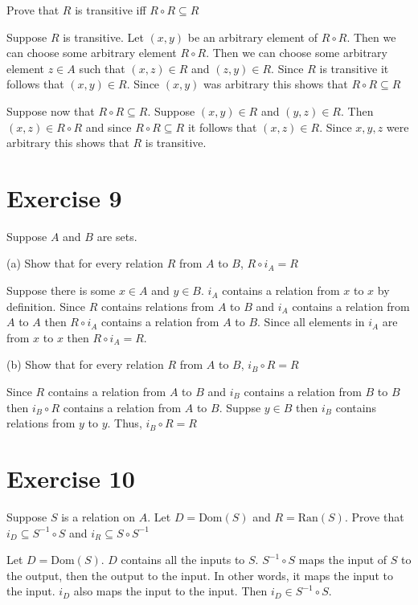 \documentclass[11pt]{article}
\begin{document}
Prove that $R$ is transitive iff $R \circ R \subseteq R$

Suppose $R$ is transitive. Let $(x, y)$ be an arbitrary element of $R \circ R$.
Then we can choose some arbitrary element $R \circ R$. Then we can choose some 
arbitrary element $z \in A$ such that $(x, z) \in R$ and $(z, y) \in R$. Since 
$R$ is transitive it follows that $(x, y) \in R$. Since $(x, y)$ was arbitrary
this shows that $R \circ R \subseteq R$

Suppose now that $R \circ R \subseteq R$. Suppose $(x, y) \in R$ and $(y, z) \in R$.
Then $(x, z) \in R \circ R$ and since $R \circ R \subseteq R$ it follows that 
$(x, z) \in R$. Since $x, y, z$ were arbitrary this shows that $R$ is transitive.

\section*{Exercise 9}

Suppose $A$ and $B$ are sets.

\noindent (a) Show that for every relation $R$ from $A$ to $B$, $R \circ i_A = R$

Suppose there is some $x \in A$ and $y \in B$. $i_A$ contains a relation from 
$x$ to $x$ by definition. Since $R$ contains relations from $A$ to $B$ and 
$i_A$ contains a relation from $A$ to $A$ then $R \circ i_A$ contains a relation
from $A$ to $B$. Since all elements in $i_A$ are from $x$ to $x$ then 
$R \circ i_A = R$.

\noindent (b) Show that for every relation $R$ from $A$ to $B$, $i_B \circ R = R$

Since $R$ contains a relation from $A$ to $B$ and $i_B$ contains a relation from 
$B$ to $B$ then $i_B \circ R$ contains a relation from $A$ to $B$. Suppse $y \in B$
then $i_B$ contains relations from $y$ to $y$. Thus, $i_B \circ R = R$

\section*{Exercise 10}

Suppose $S$ is a relation on $A$. Let $D = \text{Dom} (S)$ and $R = \text{Ran} (S)$.
Prove that $i_D \subseteq S^{-1} \circ S$ and $i_R \subseteq S \circ S^{-1}$

Let $D = \text{Dom} (S)$. $D$ contains all the inputs to $S$. $S^{-1} \circ S$ 
maps the input of $S$ to the output, then the output to the input. In other words,
it maps the input to the input. $i_D$ also maps the input to the input. Then 
$i_D \in S^{-1} \circ S$.
\end{document}
